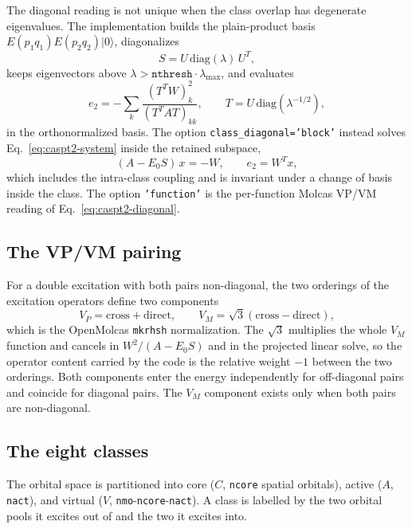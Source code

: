 The diagonal reading is not unique when the class overlap has
degenerate eigenvalues.  The implementation builds the plain-product
basis $E(p_1q_1)E(p_2q_2)|0\rangle$, diagonalizes
\begin{equation}
  S = U\,\mathrm{diag}(\lambda)\,U^{T},
  \label{eq:caspt2-overlap}
\end{equation}
keeps eigenvectors above
$\lambda>\texttt{nthresh}\cdot\lambda_{\max}$, and evaluates
\begin{equation}
  e_2 = -\sum_k \frac{(T^{T}W)_k^{2}}{(T^{T}AT)_{kk}},
  \qquad
  T = U\,\mathrm{diag}(\lambda^{-1/2}),
  \label{eq:caspt2-ortho}
\end{equation}
in the orthonormalized basis.  The option
\texttt{class\_diagonal='block'} instead solves
Eq.~\eqref{eq:caspt2-system} inside the retained subspace,
\begin{equation}
  (A-E_0 S)\,x=-W,
  \qquad
  e_2=W^{T}x,
  \label{eq:caspt2-block}
\end{equation}
which includes the intra-class coupling and is invariant under a change
of basis inside the class.  The option \texttt{'function'} is the
per-function Molcas VP/VM reading of Eq.~\eqref{eq:caspt2-diagonal}.

\subsection{The VP/VM pairing}

For a double excitation with both pairs non-diagonal, the two orderings
of the excitation operators define two components
\begin{equation}
  V_P = \mathrm{cross}+\mathrm{direct},
  \qquad
  V_M = \sqrt{3}\left(\mathrm{cross}-\mathrm{direct}\right),
  \label{eq:caspt2-vpvm}
\end{equation}
which is the OpenMolcas \texttt{mkrhsh} normalization.  The $\sqrt{3}$
multiplies the whole $V_M$ function and cancels in
$W^{2}/(A-E_0S)$ and in the projected linear solve, so the operator
content carried by the code is the relative weight $-1$ between the two
orderings.  Both components enter the energy independently for
off-diagonal pairs and coincide for diagonal pairs.  The $V_M$ component
exists only when both pairs are non-diagonal.

\subsection{The eight classes}

The orbital space is partitioned into core ($C$, \texttt{ncore}
spatial orbitals), active ($A$, \texttt{nact}), and virtual ($V$,
\texttt{nmo}-\texttt{ncore}-\texttt{nact}).  A class is labelled by
the two orbital pools it excites out of and the two it excites into.

